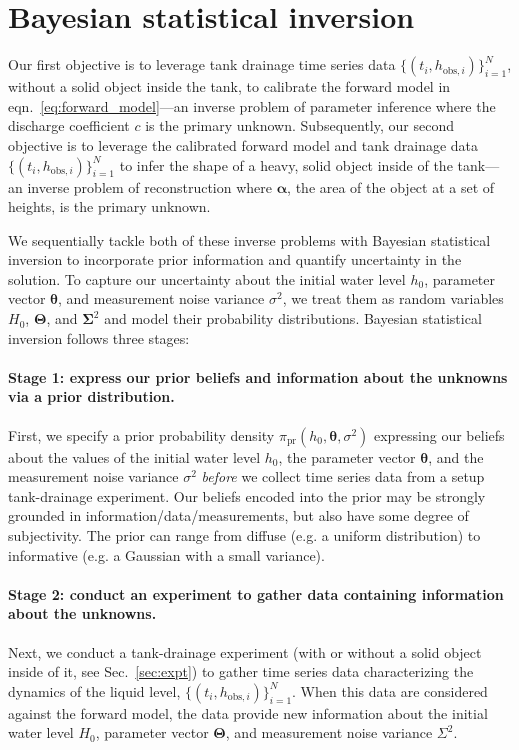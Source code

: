 \documentclass[openacc]{rsproca_new}%
\newcommand\thedata {$\{(t_i,h_{\text{obs}, i})\}_{i=1}^{N}$\xspace}
\begin{document}
\section{Bayesian statistical inversion}
Our first objective is to leverage tank drainage time series data \thedata, without a solid object inside the tank, to calibrate the forward model in eqn.~\ref{eq:forward_model}---an inverse problem of parameter inference where the discharge coefficient $c$ is the primary unknown.
Subsequently, our second objective is to leverage the calibrated forward model and tank drainage data \thedata to infer the shape of a heavy, solid object inside of the tank---an inverse problem of reconstruction where $\boldsymbol \alpha$, the area of the object at a set of heights, is the primary unknown. 

We sequentially tackle both of these inverse problems with Bayesian statistical inversion \cite{calvetti2018inverse,waqar2023tutorial,kaipio2006statistical} to incorporate prior information and quantify uncertainty in the solution.
To capture our uncertainty about the initial water level $h_0$, parameter vector $\boldsymbol \theta$, and measurement noise variance $\sigma^2$, we treat them as random variables $H_0$, $\boldsymbol \Theta$, and $\boldsymbol \Sigma^2$ and model their probability distributions. Bayesian statistical inversion follows three stages:

\vspace{-\baselineskip}
\paragraph{Stage 1: express our prior beliefs and information about the unknowns via a prior distribution.}
First, we specify a prior probability density $\pi_{\text{pr}}(h_0, \boldsymbol \theta, \sigma^2)$ expressing our beliefs about the values of the initial water level $h_0$, the parameter vector $\boldsymbol \theta$, and the measurement noise variance $\sigma^2$ \emph{before} we collect time series data from a setup tank-drainage experiment.
Our beliefs encoded into the prior may be strongly grounded in information/data/measurements, but also have some degree of subjectivity.
The prior can range from diffuse (e.g. a uniform distribution) to informative (e.g. a Gaussian with a small variance). \cite{van2021bayesian}

\vspace{-\baselineskip}
\paragraph{Stage 2: conduct an experiment to gather data containing information about the unknowns.}
Next, we conduct a tank-drainage experiment (with or without a solid object inside of it, see Sec.~\ref{sec:expt}) to gather time series data characterizing the dynamics of the liquid level, \thedata. When this data are considered against the forward model, the data provide new information about the initial water level $H_0$, parameter vector $\boldsymbol \Theta$, and measurement noise variance $\Sigma^2$.
\end{document}
